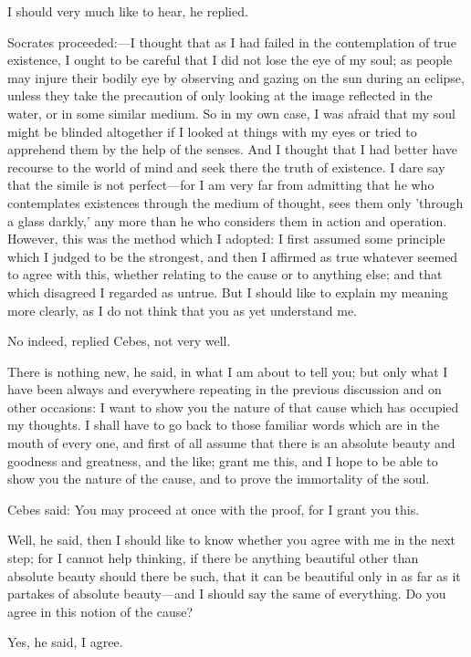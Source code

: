 I should very much like to hear, he replied.

Socrates proceeded:—I thought that as I had failed in the
contemplation of true existence, I ought to be careful that I did not lose
the eye of my soul; as people may injure their bodily eye by observing and
gazing on the sun during an eclipse, unless they take the precaution of
only looking at the image reflected in the water, or in some similar
medium. So in my own case, I was afraid that my soul might be blinded
altogether if I looked at things with my eyes or tried to apprehend them
by the help of the senses. And I thought that I had better have recourse
to the world of mind and seek there the truth of existence. I dare say
that the simile is not perfect—for I am very far from admitting that
he who contemplates existences through the medium of thought, sees them
only 'through a glass darkly,' any more than he who considers them in
action and operation. However, this was the method which I adopted: I
first assumed some principle which I judged to be the strongest, and then
I affirmed as true whatever seemed to agree with this, whether relating to
the cause or to anything else; and that which disagreed I regarded as
untrue. But I should like to explain my meaning more clearly, as I do not
think that you as yet understand me.

No indeed, replied Cebes, not very well.

There is nothing new, he said, in what I am about to tell you; but only
what I have been always and everywhere repeating in the previous
discussion and on other occasions: I want to show you the nature of that
cause which has occupied my thoughts. I shall have to go back to those
familiar words which are in the mouth of every one, and first of all
assume that there is an absolute beauty and goodness and greatness, and
the like; grant me this, and I hope to be able to show you the nature of
the cause, and to prove the immortality of the soul.

Cebes said: You may proceed at once with the proof, for I grant you this.

Well, he said, then I should like to know whether you agree with me in the
next step; for I cannot help thinking, if there be anything beautiful
other than absolute beauty should there be such, that it can be beautiful
only in as far as it partakes of absolute beauty—and I should say
the same of everything. Do you agree in this notion of the cause?

Yes, he said, I agree.

